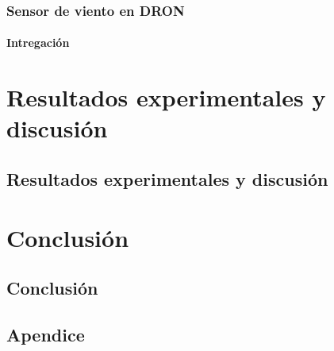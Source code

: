 \documentclass[spanish]{book}
\begin{document}
        \section{Sensor de viento en DRON}
        	\subsection{Intregación}

\part{Resultados experimentales y discusión}
    \chapter{Resultados experimentales y discusión}

\part{Conclusión}
    \chapter{Conclusión}

\appendix

\chapter{Apendice}
\end{document}
